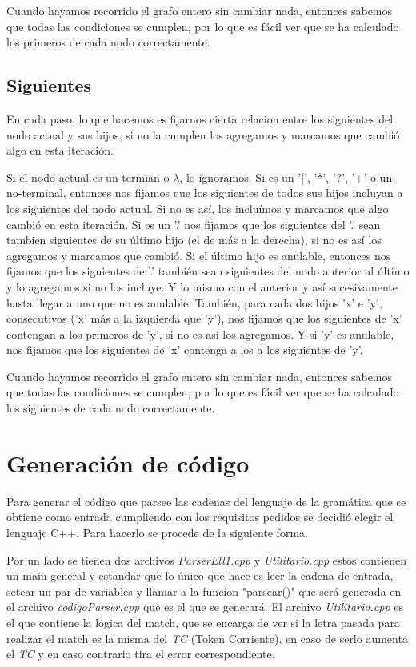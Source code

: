 \documentclass[a4paper]{report}
\begin{document}
	Cuando hayamos recorrido el grafo entero sin cambiar nada, entonces
sabemos que todas las condiciones se cumplen, por lo que es fácil ver que se ha
calculado los primeros de cada nodo correctamente.


\subsection*{Siguientes}

	En cada paso, lo que hacemos es fijarnos cierta relacion entre los
siguientes del nodo actual y sus hijos, si no la cumplen los agregamos y marcamos que
cambió algo en esta iteración.


	Si el nodo actual es un termian o $\lambda$, lo ignoramos. Si es un '|',
'*', '?', '+' o un no-terminal, entonces nos fijamos que los siguientes de todos
sus hijos incluyan a los siguientes del nodo actual. Si no es así, los incluímos
y marcamos que algo cambió en esta iteración. Si es un '.' nos fijamos que los
siguientes del '.' sean tambien siguientes de su último hijo (el de más a la
derecha), si no es así los agregamos y marcamos que cambió. Si el último hijo es
anulable, entonces nos fijamos que los siguientes de '.' también sean siguientes
del nodo anterior al último y lo agregamos si no los incluye. Y lo mismo con el
anterior y así sucesivamente hasta llegar a uno que no es anulable. También,
para cada dos hijos 'x' e 'y', consecutivos ('x' más a la izquierda que 'y'),
nos fijamos que los siguientes de 'x' contengan a los primeros de 'y', si no es
así los agregamos. Y si 'y' es anulable, nos fijamos que los siguientes de 'x'
contenga a los a los siguientes de 'y'.


	Cuando hayamos recorrido el grafo entero sin cambiar nada, entonces
sabemos que todas las condiciones se cumplen, por lo que es fácil ver que se ha
calculado los siguientes de cada nodo correctamente.


\section*{Generación de código}


Para generar el código que parsee las cadenas del lenguaje de la gramática que se 
obtiene como entrada cumpliendo con los requisitos pedidos se decidió elegir el lenguaje C++. Para hacerlo se procede de la siguiente forma.


Por un lado se tienen dos archivos \emph{ParserEll1.cpp} y \emph{Utilitario.cpp} estos contienen un main general y estandar
que lo único que hace es leer la cadena de entrada, setear un par de variables y llamar a la funcion "parsear()" 
que será generada en el archivo \emph{codigoParser.cpp} que es el que se generará. El archivo \emph{Utilitario.cpp} 
es el que contiene la lógica del match, que se encarga de ver si la letra pasada para realizar el match es la misma del \emph{TC} 
(Token Corriente), en caso de serlo aumenta el \emph{TC} y en caso contrario tira el error correspondiente.
\end{document}
